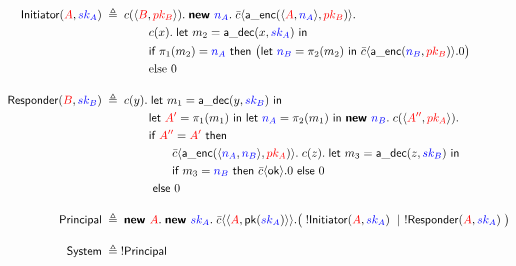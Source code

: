 \documentclass{article}
\theoremstyle{definition}
\newcommand{\blue}[1]{\textcolor{blue}{#1}}
\newcommand{\red}[1]{\textcolor{red}{#1}}
\begin{document}
\[
\begin{aligned}
\mathsf{Initiator}(\red{A},\blue{sk_A})
&\;\triangleq\;
c(\langle \red{B}, \red{pk_B}\rangle).\;
\textbf{\textsf{new }} \blue{n_A}.\;
\bar{c}\langle \mathsf{a\_enc}(\langle \red{A}, \blue{n_A} \rangle, \red{pk_B}) \rangle .
\\
&\hspace{4em}
c(x).\;
\textsf{let } m_2 = \mathsf{a\_dec}(x, \blue{sk_A}) \textsf{ in }
\\
&\hspace{4em}
\textsf{if } \pi_1(m_2) = \blue{n_A} \textsf{ then }
\big(
  \textsf{let } \blue{n_B} = \pi_2(m_2) \textsf{ in }
  \bar{c}\langle \mathsf{a\_enc}(\blue{n_B}, \red{pk_B}) \rangle . 0
\big)
\\
&\hspace{4em}
\text{else } 0
\\[1.0em]
\mathsf{Responder}(\red{B},\blue{sk_B})
&\;\triangleq\;
c(y).\;
\textsf{let } m_1 = \mathsf{a\_dec}(y, \blue{sk_B}) \textsf{ in }
\\
&\hspace{4em}
\textsf{let } \red{A'} = \pi_1(m_1) \textsf{ in }
\textsf{let } \blue{n_A} = \pi_2(m_1) \textsf{ in }
\textbf{\textsf{new }} \blue{n_B}.\;
c(\langle \red{A''}, \red{pk_A}\rangle).\;
\\
&\hspace{4em}
\textsf{if } \red{A''} = \red{A'} \textsf{ then }
\\
&\hspace{6em}
\bar{c}\langle \mathsf{a\_enc}(\langle \blue{n_A}, \blue{n_B} \rangle, \red{pk_A}) \rangle .\; 
  c(z).\;
  \textsf{let } m_3 = \mathsf{a\_dec}(z, \blue{sk_B}) \textsf{ in }
  \\
  &\hspace{6em}
  \textsf{if } m_3 = \blue{n_B} \textsf{ then } \bar c \langle \mathsf{ok} \rangle.0 \textsf{ else } 0
\\&\hspace{4em}
\textsf{ else } 0
\\[1.0em]
\mathsf{Principal}
&\;\triangleq\;
\textbf{\textsf{new }}\red{A}.\;\textbf{\textsf{new }}\blue{sk_A}.\;
\bar{c}\langle \langle \red{A}, \mathsf{pk}(\blue{sk_A}) \rangle \rangle .
\big(\; !\mathsf{Initiator}(\red{A},\blue{sk_A})\ \mid\ !\mathsf{Responder}(\red{A},\blue{sk_A})\;\big)
\\[1.0em]
\mathsf{System}
&\;\triangleq\;
!\mathsf{Principal}
\end{aligned}
\]
\end{document}
